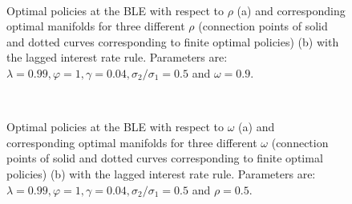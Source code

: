 \begin{figure}
    \begin{center}
          \mbox{\quad
        }
        \end{center}
   \caption{ \label{optrhotrlag}
  Optimal policies at the BLE with respect to $\rho$ (a) and corresponding optimal manifolds for three different $\rho$ (connection points of solid and dotted curves corresponding to finite optimal policies) (b) with the lagged interest rate rule.
   Parameters are: $\lambda=0.99, \varphi=1, \gamma=0.04, \sigma_{2}/\sigma_1=0.5$ and $\omega=0.9$. }
    \end{figure}
    
\begin{figure}
    \begin{center}
          \mbox{\quad
        }
        \end{center}
   \caption{ \label{optomegatrlag}
  Optimal policies at the BLE with respect to $\omega$ (a) and corresponding optimal manifolds for three different $\omega$ (connection points of solid and dotted curves corresponding to finite optimal policies) (b) with the lagged interest rate rule.
   Parameters are: $\lambda=0.99, \varphi=1, \gamma=0.04,\sigma_{2}/\sigma_1=0.5$ and $\rho=0.5$. }
    \end{figure}    
    
